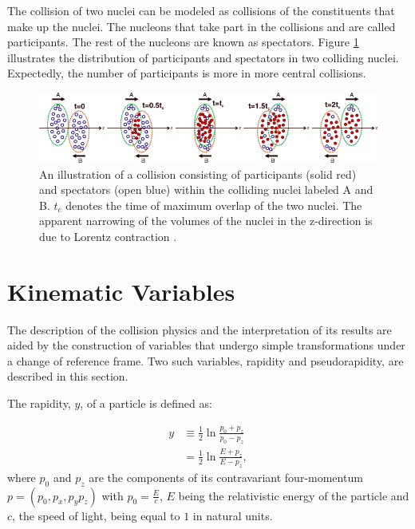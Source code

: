 The collision of two nuclei can be modeled as collisions of the constituents that make up the nuclei. The nucleons that take part in the collisions and are called participants. The rest of the nucleons are known as spectators. Figure \ref{fig:part_spec} illustrates the distribution of participants and spectators in two colliding nuclei. Expectedly, the number of participants is more in more central collisions.
\begin{figure}[h]
  \centering
  \includegraphics[width=6.5in]{figures/part_spec_Vovchenko.png}
  \caption{An illustration of a collision consisting of participants (solid red) and spectators (open blue) within the colliding nuclei labeled A and B. $t_{c}$ denotes the time of maximum overlap of the two nuclei. The apparent narrowing of the volumes of the nuclei in the z-direction is due to Lorentz contraction \cite{PhysRevC.90.044907}.}\label{fig:part_spec}
\end{figure}



\section{Kinematic Variables}
The description of the collision physics and the interpretation of its results are aided by the construction of variables that undergo simple transformations under a change of reference frame. Two such variables, rapidity and pseudorapidity, are described in this section.

The rapidity, $y$, of a particle is defined as:

	\begin{align}\label{def:rapidity}
	y &\equiv \frac{1}{2}\ln{\frac{p_{0} + p_{z}}{p_{0} - p_{z}}}\\
	&= \frac{1}{2}\ln{\frac{E + p_{z}}{E - p_{z}}},
	\end{align}
where $p_{0}$ and $p_{z}$ are the components of its contravariant four-momentum $p = (p_{0}, p_{x}, p_{y} p_{z})$ with $p_{0} = \frac{E}{c}$, $E$ being the relativistic energy of the particle and $c$, the speed of light, being equal to $1$ in natural units.

